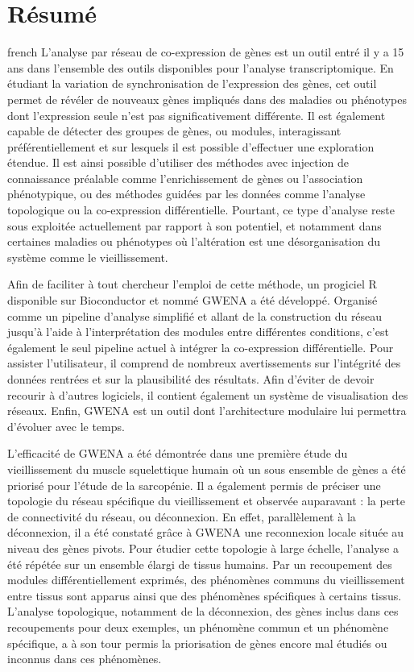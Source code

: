\chapter*{Résumé}                      %

\begin{otherlanguage*}{french}
L'analyse par réseau de co-expression de gènes est un outil entré il y a 15 ans dans l'ensemble des outils disponibles pour l'analyse transcriptomique. En étudiant la variation de synchronisation de l'expression des gènes, cet outil permet de révéler de nouveaux gènes impliqués dans des maladies ou phénotypes dont l'expression seule n'est pas significativement différente. Il est également capable de détecter des groupes de gènes, ou modules, interagissant préférentiellement et sur lesquels il est possible d'effectuer une exploration étendue. Il est ainsi possible d'utiliser des méthodes avec injection de connaissance préalable comme l'enrichissement de gènes ou l'association phénotypique, ou des méthodes guidées par les données comme l'analyse topologique ou la co-expression différentielle. Pourtant, ce type d'analyse reste sous exploitée actuellement par rapport à son potentiel, et notamment dans certaines maladies ou phénotypes où l'altération est une désorganisation du système comme le vieillissement. 

Afin de faciliter à tout chercheur l'emploi de cette méthode, un progiciel R disponible sur Bioconductor et nommé GWENA a été développé. Organisé comme un pipeline d'analyse simplifié et allant de la construction du réseau jusqu'à l'aide à l'interprétation des modules entre différentes conditions, c'est également le seul pipeline actuel à intégrer la co-expression différentielle. Pour assister l'utilisateur, il comprend de nombreux avertissements sur l'intégrité des données rentrées et sur la plausibilité des résultats. Afin d'éviter de devoir recourir à d'autres logiciels, il contient également un système de visualisation des réseaux. Enfin, GWENA est un outil dont l'architecture modulaire lui permettra d'évoluer avec le temps.

L'efficacité de GWENA a été démontrée dans une première étude du vieillissement du muscle squelettique humain où un sous ensemble de gènes a été priorisé pour l'étude de la sarcopénie. Il a également permis de préciser une topologie du réseau spécifique du vieillissement et observée auparavant : la perte de connectivité du réseau, ou déconnexion. En effet, parallèlement à la déconnexion, il a été constaté grâce à GWENA une reconnexion locale située au niveau des gènes pivots. Pour étudier cette topologie à large échelle, l'analyse a été répétée sur un ensemble élargi de tissus humains. Par un recoupement des modules différentiellement exprimés, des phénomènes communs du vieillissement entre tissus sont apparus ainsi que des phénomènes spécifiques à certains tissus. L'analyse topologique, notamment de la déconnexion, des gènes inclus dans ces recoupements pour deux exemples, un phénomène commun et un phénomène spécifique, a à son tour permis la priorisation de gènes encore mal étudiés ou inconnus dans ces phénomènes.


\end{otherlanguage*}
